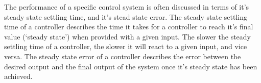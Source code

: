 The performance of a specific control system is often discussed in terms of it's steady state settling time, and it's stead state error. The steady state settling time of a controller describes the time it takes for a controller to reach it's final value (`steady state') when provided with a given input. The slower the steady settling time of a controller, the slower it will react to a given input, and vice versa. The steady state error of a controller describes the error between the desired output and the final output of the system once it's steady state has been achieved. 